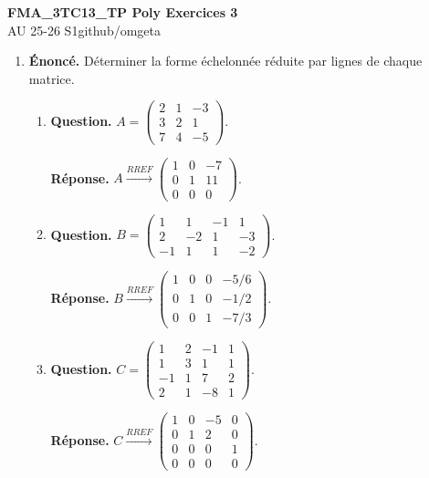\documentclass[12pt, a4paper]{article}
\newcommand{\mytitle}{FMA\_3TC13\_TP Poly Exercices 3}
\newcommand{\myauthor}{github/omgeta}
\newcommand{\mydate}{AU 25-26 S1}
\begin{document}
\raggedright
\footnotesize
\begin{center}
{\normalsize{\textbf{\mytitle}}} \\
{\footnotesize{\mydate\hspace{2pt}\textemdash\hspace{2pt}\myauthor}}
\end{center}
\begin{enumerate}[label=3.\arabic*., start=25]

  \item \begin{minipage}[t]{\linewidth}\raggedright
\textbf{Énoncé.} Déterminer la forme échelonnée réduite par lignes de chaque matrice.

\begin{enumerate}[\arabic*.]
      \item \textbf{Question.} $\displaystyle A=\begin{pmatrix}2&1&-3\\3&2&1\\7&4&-5\end{pmatrix}$.
\par\smallskip
\textbf{Réponse.} $\displaystyle A\xrightarrow{RREF}\begin{pmatrix}1&0&-7\\0&1&11\\0&0&0\end{pmatrix}$.

  \item \textbf{Question.} $\displaystyle B=\begin{pmatrix}1&1&-1&1\\2&-2&1&-3\\-1&1&1&-2\end{pmatrix}$.
\par\smallskip
\textbf{Réponse.} $\displaystyle B\xrightarrow{RREF}\begin{pmatrix}1&0&0&-5/6\\0&1&0&-1/2\\0&0&1&-7/3\end{pmatrix}$.

  \item \textbf{Question.} $\displaystyle C=\begin{pmatrix}1&2&-1&1\\1&3&1&1\\-1&1&7&2\\2&1&-8&1\end{pmatrix}$.
\par\smallskip
\textbf{Réponse.} $\displaystyle C\xrightarrow{RREF}\begin{pmatrix}1&0&-5&0\\0&1&2&0\\0&0&0&1\\0&0&0&0\end{pmatrix}$.


\end{enumerate}
\end{minipage}
\end{enumerate}
\end{document}
